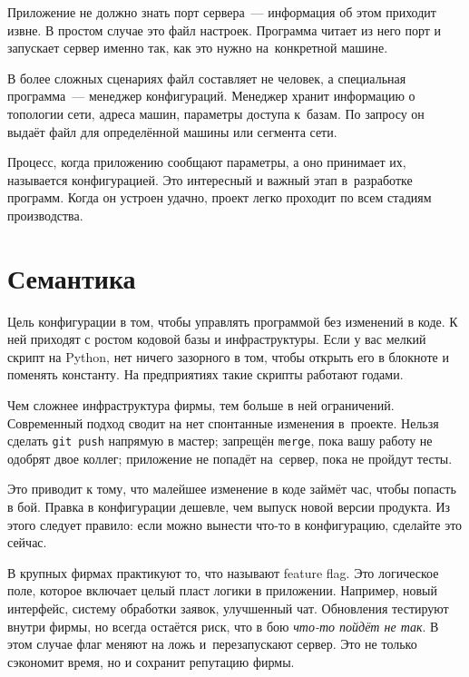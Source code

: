 Приложение не должно знать порт сервера~--- информация об этом приходит извне. В
простом случае это файл настроек. Программа читает из него порт и запускает
сервер именно так, как это нужно на~конкретной машине.


В более сложных сценариях файл составляет не человек, а специальная
программа~--- менеджер конфигураций. Менеджер хранит информацию о топологии
сети, адреса машин, параметры доступа к~базам. По запросу он выдаёт файл для
определённой машины или сегмента сети.

Процесс, когда приложению сообщают параметры, а оно принимает их, называется
конфигурацией. Это интересный и важный этап в~разработке программ. Когда он
устроен удачно, проект легко проходит по всем стадиям производства.

\section{Семантика}

Цель конфигурации в том, чтобы управлять программой без изменений в коде. К ней
приходят с ростом кодовой базы и инфраструктуры. Если у вас мелкий скрипт на
Python, нет ничего зазорного в том, чтобы открыть его в блокноте и поменять
константу. На предприятиях такие скрипты работают годами.

Чем сложнее инфраструктура фирмы, тем больше в ней ограничений. Современный
подход сводит на нет спонтанные изменения в~проекте. Нельзя сделать \verb|git push|
напрямую в мастер; запрещён \verb|merge|, пока вашу работу не одобрят
двое коллег; приложение не попадёт на~сервер, пока не пройдут тесты.

Это приводит к тому, что малейшее изменение в коде займёт час, чтобы попасть в
бой. Правка в конфигурации дешевле, чем выпуск новой версии продукта. Из этого
следует правило: если можно вынести что-то в конфигурацию, сделайте это сейчас.


В крупных фирмах практикуют то, что называют feature flag. Это логическое
поле, которое включает целый пласт логики в приложении. Например, новый
интерфейс, систему обработки заявок, улучшенный чат. Обновления тестируют внутри
фирмы, но всегда остаётся риск, что в бою \emph{что-то пойдёт не так}. В этом случае
флаг меняют на ложь и~перезапускают сервер. Это не только сэкономит время, но и
сохранит репутацию фирмы.

\label{feature-flags}

